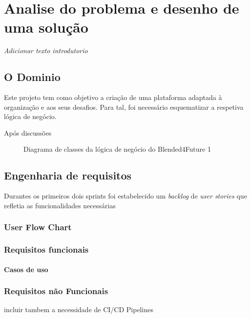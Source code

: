 \chapter{Analise do problema e desenho de uma solução}
\label{chap:analisedoproblema}

\textit{Adicionar texto introdutorio}

\section{O Dominio}

Este projeto tem como objetivo a criação de uma plataforma adaptada à organização e aos seus desafios. Para tal, foi necessário esquematizar a respetiva lógica de negócio.

Após discussões 

\begin{figure}    
    \centering
    \caption{Diagrama de classes da lógica de negócio do Blended4Future 1}
    \label{fig:cd}
\end{figure}


\section{Engenharia de requisitos}

Durantes os primeiros dois sprints foi estabelecido um \textit{backlog} de \textit{user stories} que refletia as funcionalidades necessárias


\subsection{User Flow Chart}

\subsection{Requisitos funcionais}

\subsubsection{Casos de uso}

\subsection{Requisitos não Funcionais}

incluir tambem a necessidade de CI/CD Pipelines


